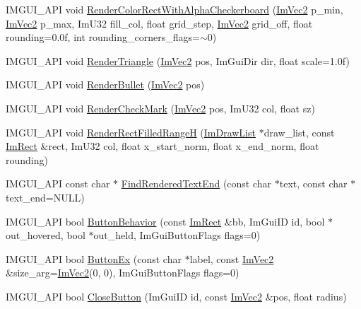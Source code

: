 \begin{DoxyCompactItemize}
\item 
I\+M\+G\+U\+I\+\_\+\+A\+PI void \hyperlink{namespace_im_gui_a4715686ee0c613e8518c0f5e92c358ce}{Render\+Color\+Rect\+With\+Alpha\+Checkerboard} (\hyperlink{struct_im_vec2}{Im\+Vec2} p\+\_\+min, \hyperlink{struct_im_vec2}{Im\+Vec2} p\+\_\+max, Im\+U32 fill\+\_\+col, float grid\+\_\+step, \hyperlink{struct_im_vec2}{Im\+Vec2} grid\+\_\+off, float rounding=0.\+0f, int rounding\+\_\+corners\+\_\+flags=$\sim$0)
\item 
I\+M\+G\+U\+I\+\_\+\+A\+PI void \hyperlink{namespace_im_gui_ad11a82904a65722d285230567af826b8}{Render\+Triangle} (\hyperlink{struct_im_vec2}{Im\+Vec2} pos, Im\+Gui\+Dir dir, float scale=1.\+0f)
\item 
I\+M\+G\+U\+I\+\_\+\+A\+PI void \hyperlink{namespace_im_gui_a2d0e4160081b3953fc8f88e2d8e8da15}{Render\+Bullet} (\hyperlink{struct_im_vec2}{Im\+Vec2} pos)
\item 
I\+M\+G\+U\+I\+\_\+\+A\+PI void \hyperlink{namespace_im_gui_a6adfc430445ed42a65556ffb0d58a8b8}{Render\+Check\+Mark} (\hyperlink{struct_im_vec2}{Im\+Vec2} pos, Im\+U32 col, float sz)
\item 
I\+M\+G\+U\+I\+\_\+\+A\+PI void \hyperlink{namespace_im_gui_af311762331bda4508b25e05f6afc7f45}{Render\+Rect\+Filled\+RangeH} (\hyperlink{struct_im_draw_list}{Im\+Draw\+List} $\ast$draw\+\_\+list, const \hyperlink{struct_im_rect}{Im\+Rect} \&rect, Im\+U32 col, float x\+\_\+start\+\_\+norm, float x\+\_\+end\+\_\+norm, float rounding)
\item 
I\+M\+G\+U\+I\+\_\+\+A\+PI const char $\ast$ \hyperlink{namespace_im_gui_a7671e1dbc803a31b06081b52a771d83f}{Find\+Rendered\+Text\+End} (const char $\ast$text, const char $\ast$text\+\_\+end=N\+U\+LL)
\item 
I\+M\+G\+U\+I\+\_\+\+A\+PI bool \hyperlink{namespace_im_gui_a65a4f18b1bc8ce0f351687922089f374}{Button\+Behavior} (const \hyperlink{struct_im_rect}{Im\+Rect} \&bb, Im\+Gui\+ID id, bool $\ast$out\+\_\+hovered, bool $\ast$out\+\_\+held, Im\+Gui\+Button\+Flags flags=0)
\item 
I\+M\+G\+U\+I\+\_\+\+A\+PI bool \hyperlink{namespace_im_gui_ae479220c66b039874c6e4c9e9b22849f}{Button\+Ex} (const char $\ast$label, const \hyperlink{struct_im_vec2}{Im\+Vec2} \&size\+\_\+arg=\hyperlink{struct_im_vec2}{Im\+Vec2}(0, 0), Im\+Gui\+Button\+Flags flags=0)
\item 
I\+M\+G\+U\+I\+\_\+\+A\+PI bool \hyperlink{namespace_im_gui_a5e8e4df6418dcda3c4c5d15ecdf7d968}{Close\+Button} (Im\+Gui\+ID id, const \hyperlink{struct_im_vec2}{Im\+Vec2} \&pos, float radius)

\end{DoxyCompactItemize}

